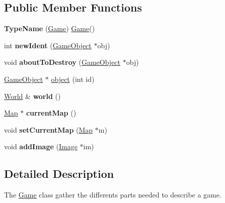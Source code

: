 \subsection*{\-Public \-Member \-Functions}
\begin{DoxyCompactItemize}
\item 
\hypertarget{class_game_a8df2d5e5d28872b8a1d275d1ca92be4a}{{\bfseries \-Type\-Name} (\hyperlink{class_game}{\-Game}) \hyperlink{class_game}{\-Game}()}\label{class_game_a8df2d5e5d28872b8a1d275d1ca92be4a}

\item 
\hypertarget{class_game_ae64a3a16c7460ff0709ff5935ac0b0dd}{int {\bfseries new\-Ident} (\hyperlink{class_game_object}{\-Game\-Object} $\ast$obj)}\label{class_game_ae64a3a16c7460ff0709ff5935ac0b0dd}

\item 
\hypertarget{class_game_a944eb939fcae4546db1ef3b9bc199417}{void {\bfseries about\-To\-Destroy} (\hyperlink{class_game_object}{\-Game\-Object} $\ast$obj)}\label{class_game_a944eb939fcae4546db1ef3b9bc199417}

\item 
\hyperlink{class_game_object}{\-Game\-Object} $\ast$ \hyperlink{class_game_afc34f1c4cf865c1af7acc4b30ba44cb9}{object} (int id)
\item 
\hypertarget{class_game_a505763c778d70a1f03fbb3d231394b8a}{\hyperlink{class_world}{\-World} \& {\bfseries world} ()}\label{class_game_a505763c778d70a1f03fbb3d231394b8a}

\item 
\hypertarget{class_game_a3b242dcb7703b409692ce0c91e799a8c}{\hyperlink{class_map}{\-Map} $\ast$ {\bfseries current\-Map} ()}\label{class_game_a3b242dcb7703b409692ce0c91e799a8c}

\item 
\hypertarget{class_game_af7394ea8ff98b0b819125a6bac47db2b}{void {\bfseries set\-Current\-Map} (\hyperlink{class_map}{\-Map} $\ast$m)}\label{class_game_af7394ea8ff98b0b819125a6bac47db2b}

\item 
\hypertarget{class_game_a8c246c639e16c351b7f261dc44a0897d}{void {\bfseries add\-Image} (\hyperlink{class_image}{\-Image} $\ast$im)}\label{class_game_a8c246c639e16c351b7f261dc44a0897d}

\end{DoxyCompactItemize}


\subsection{\-Detailed \-Description}
\-The \hyperlink{class_game}{\-Game} class gather the differents parts needed to describe a game. 

